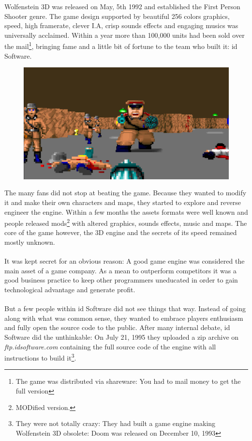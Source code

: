 Wolfenstein 3D was released on May, 5th 1992 and established the First Person Shooter genre. The game design supported by beautiful 256 colors graphics, speed, high framerate, clever I.A, crisp sounds effects and engaging musics was universally acclaimed. Within a year more than 100,000 units had been sold over the mail\footnote{The game was distributed via shareware: You had to mail money to get the full version}, bringing fame and a little bit of fortune to the team who built it: id Software.\\
\par
 \begin{figure}[H]
\centering
      \includegraphics[width=\textwidth]{screenshots/action_packed.png} 
\end{figure}
\par
The many fans did not stop at beating the game. Because they wanted to modify it and make their own characters and maps, they started to explore and reverse engineer the engine. Within a few months the assets formats were well known and people released mods\footnote{MODified version.} with altered graphics, sounds effects, music and maps. The core of the game however, the 3D engine and the secrets of its speed remained mostly unknown.\\
\\
It was kept secret for an obvious reason: A good game engine was considered the main asset of a game company. As a mean to outperform competitors it was a good business practice to keep other programmers  uneducated in order to gain technological advantage and generate profit.\\
\\
But a few people within id Software did not see things that way. Instead of going along with what was common sense, they wanted to embrace players enthusiasm and fully open the source code to the public. After many internal debate, id Software did the unthinkable: On July 21, 1995 they uploaded a zip archive on \emph{ftp.idsoftware.com} containing the full source code of the engine with all instructions to build it\footnote{They were not totally crazy: They had built a game engine making Wolfenstein 3D obsolete: Doom was released on December 10, 1993}.\\

